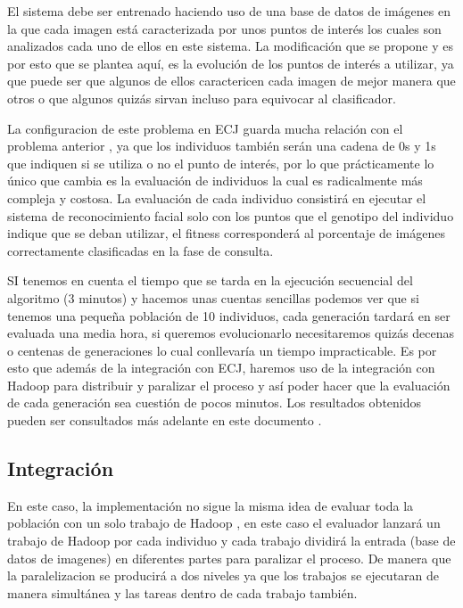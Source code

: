El sistema debe ser entrenado haciendo uso de una base de datos de imágenes en la que cada imagen est\'a caracterizada por unos puntos de interés los cuales son analizados cada uno de ellos en este sistema. La modificación que se propone y es por esto que se plantea aquí, es la evolución de los puntos de interés a utilizar, ya que puede ser que algunos de ellos caractericen cada imagen de mejor manera que otros o que algunos quizás sirvan incluso para equivocar al clasificador.

La configuracion de este problema en ECJ guarda mucha relación con el problema anterior , ya que los individuos también serán una cadena de 0s y 1s que indiquen si se utiliza o no el punto de interés, por lo que prácticamente lo único que cambia es la evaluación de individuos la cual es radicalmente m\'as compleja y costosa. La evaluación de cada individuo consistirá en ejecutar el sistema de reconocimiento facial solo con los puntos que el genotipo del individuo indique que se deban utilizar, el fitness corresponderá al porcentaje de imágenes correctamente clasificadas en la fase de consulta.

SI tenemos en cuenta el tiempo que se tarda en la ejecución secuencial del algoritmo (3 minutos) y hacemos unas cuentas sencillas podemos ver que si tenemos una peque\~na población de 10 individuos, cada generación tardar\'a en ser evaluada una media hora, si queremos evolucionarlo necesitaremos quizás decenas o centenas de generaciones lo cual conllevar\'ia un tiempo impracticable. Es por esto que adem\'as de la integración con ECJ, haremos uso de la integración con Hadoop para distribuir y paralizar el proceso y así poder hacer que la evaluación de cada generación sea cuestión de pocos minutos. Los resultados obtenidos pueden ser consultados m\'as adelante en este documento .

\subsection{Integraci\'on}

En este caso, la implementación no sigue la misma idea de evaluar toda la población con un solo trabajo de Hadoop , en este caso el evaluador lanzar\'a un trabajo de Hadoop por cada individuo y cada trabajo dividir\'a la entrada (base de datos de imagenes) en diferentes partes para paralizar el proceso. De manera que la paralelizacion se producirá a dos niveles ya que los trabajos se ejecutaran de manera simultánea y las tareas dentro de cada trabajo también.

